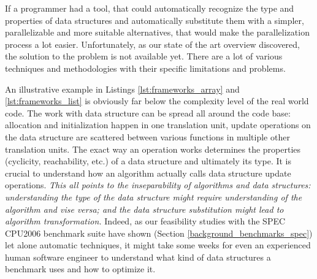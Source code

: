 \begin{description}[style=unboxed,leftmargin=0cm]
If a programmer had a tool, that could automatically recognize the type and properties of data structures and automatically substitute them with a simpler, parallelizable and more suitable alternatives, that would make the parallelization process a lot easier. Unfortunately, as our state of the art overview discovered, the solution to the problem is not available yet. There are a lot of various techniques and methodologies with their specific limitations and problems.
\item[\textit{Data structure and algorithm inseparability}] An illustrative example in Listings \ref{lst:frameworks_array} and \ref{lst:frameworks_list} is obviously far below the complexity level of the real world code. The work with data structure can be spread all around the code base: allocation and initialization happen in one translation unit, update operations on the data structure are scattered between various functions in multiple other translation units. The exact way an operation works determines the properties (cyclicity, reachability, etc.) of a data structure and ultimately its type. It is crucial to understand how an algorithm actually calls data structure update operations. \textit{This all points to the inseparability of algorithms and data structures: understanding the type of the data structure might require understanding of the algorithm and vise versa; and the data structure substitution might lead to algorithm transformation.} Indeed, as our feasibility studies with the SPEC CPU2006 benchmark suite have shown (Section \ref{background_benchmarks_spec}) let alone automatic techniques, it might take some weeks for even an experienced human software engineer to understand what kind of data structures a benchmark uses and how to optimize it.

\end{description}
